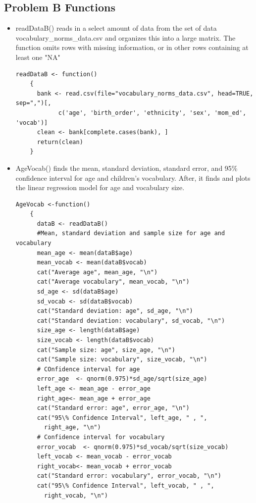 \documentclass[11pt]{article}  %
\begin{document}
\subsection{Problem B Functions}
\label{sec:probbfunc}
\begin{itemize}
    
    \label{sec:RDB}
    \item readDataB() reads in a select amount of data from the set of data vocabulary\_norms\_data.csv and organizes this into a large matrix. The function omits rows with missing information, or in other rows containing at least one "NA"
    \begin{lstlisting}[basicstyle=\small]
    readDataB <- function()
    {
      bank <- read.csv(file="vocabulary_norms_data.csv", head=TRUE, sep=",")[,
            c('age', 'birth_order', 'ethnicity', 'sex', 'mom_ed', 'vocab')]
      clean <- bank[complete.cases(bank), ]
      return(clean)
    }
    \end{lstlisting}
    
    \label{sec:AV}
    \item AgeVocab() finds the mean, standard deviation, standard error, and 95\% confidence interval for age and children's vocabulary. After, it finds and plots the linear regression model for age and vocabulary size. 
    \begin{lstlisting}[basicstyle=\small]
    AgeVocab <-function()
    {
      dataB <- readDataB()
      #Mean, standard deviation and sample size for age and vocabulary
      mean_age <- mean(dataB$age)
      mean_vocab <- mean(dataB$vocab)
      cat("Average age", mean_age, "\n")
      cat("Average vocabulary", mean_vocab, "\n")
      sd_age <- sd(dataB$age)
      sd_vocab <- sd(dataB$vocab)
      cat("Standard deviation: age", sd_age, "\n")
      cat("Standard deviation: vocabulary", sd_vocab, "\n")
      size_age <- length(dataB$age)
      size_vocab <- length(dataB$vocab)
      cat("Sample size: age", size_age, "\n")
      cat("Sample size: vocabulary", size_vocab, "\n")
      # COnfidence interval for age
      error_age  <- qnorm(0.975)*sd_age/sqrt(size_age) 
      left_age <- mean_age - error_age
      right_age<- mean_age + error_age
      cat("Standard error: age", error_age, "\n")
      cat("95\% Confidence Interval", left_age, " , ",
        right_age, "\n")
      # Confidence interval for vocabulary    
      error_vocab  <- qnorm(0.975)*sd_vocab/sqrt(size_vocab)
      left_vocab <- mean_vocab - error_vocab
      right_vocab<- mean_vocab + error_vocab
      cat("Standard error: vocabulary", error_vocab, "\n")
      cat("95\% Confidence Interval", left_vocab, " , ",
        right_vocab, "\n")
    

\end{lstlisting}
\end{itemize}
\end{document}
